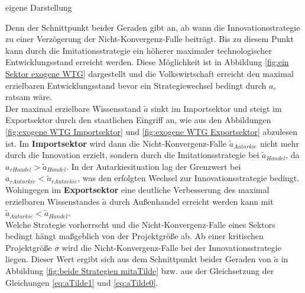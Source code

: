 	\begin{figure*}[htbp]
		\hfill{}  eigene Darstellung
		\caption{beide Strategien mit $\widetilde{a}$}
		\label{fig:beide Strategien mitaTilde}
	\end{figure*}


Denn der Schnittpunkt beider Geraden gibt an, ab wann die \textcolor[rgb]{0.74,0.97,0.22}{Innovationsstrategie} zu einer Verzögerung der Nicht-Konvergenz-Falle beiträgt. Bis zu diesem Punkt kann durch die \textcolor[rgb]{0,0.32,0}{Imitationsstrategie} ein höherer maximaler technologischer Entwicklungsstand erreicht werden. Diese Möglichkeit ist in Abbildung \ref{fig:ein Sektor exogene WTG} dargestellt und die Volkswirtschaft erreicht den maximal erzielbaren Entwicklungsstand bevor ein Strategiewechsel bedingt durch $a_r$ ratsam wäre.\\


Der maximal erzielbare Wissensstand $\tilde{a}$ sinkt im Importsektor  und steigt im Exportsektor durch den staatlichen Eingriff an, wie aus den Abbildungen \ref{fig:exogene WTG Importsektor} und \ref{fig:exogene WTG Exportsektor} abzulesen ist. Im \textbf{Importsektor} wird dann die Nicht-Konvergenz-Falle $\tilde{a}_{Autarkie}$ nicht mehr durch die Innovation erzielt, sondern durch die \textcolor[rgb]{0,0.32,0}{Imitationsstrategie} bei $\tilde{a}_{Handel}$, da $a_{rHandel}>\tilde{a}_{Handel}$. In der Autarkiesituation lag der Grenzwert bei $a_{rAutarkie}<\tilde{a}_{rAutarkie}$, was den erfolgten Wechsel zur \textcolor[rgb]{0.74,0.97,0.22}{Innovationsstrategie} bedingt. Wohingegen im \textbf{Exportsektor} eine deutliche Verbesserung des maximal erzielbaren Wissenstandes $\tilde{a}$ durch Außenhandel erreicht werden kann mit $\tilde{a}_{Autarkie}<\tilde{a}_{Handel}$.\\
Welche Strategie vorherrscht und die Nicht-Konvergenz-Falle eines Sektors bedingt hängt maßgeblich von der Projektgröße ab. Ab einer kritischen Projektgröße $\overline{\sigma}$ wird die Nicht-Konvergenz-Falle bei der Innovationsstrategie liegen. Dieser Wert ergibt sich aus dem Schnittpunkt beider Geraden von $\tilde{a}$ in Abbildung \ref{fig:beide Strategien mitaTilde} bzw. aus der Gleichsetzung der Gleichungen \ref{eq:aTilde1} und \ref{eq:aTilde0}.


